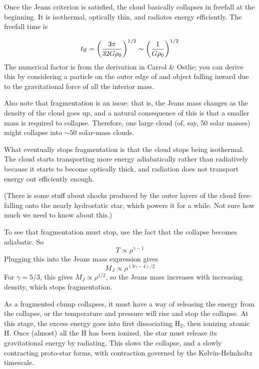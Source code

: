 Once the Jeans criterion is satisfied, the cloud basically collapses in freefall at the beginning. It is isothermal, optically thin, and radiates energy efficiently. The freefall time is

\begin{equation}
t_{\rm ff} = \biggl( \frac{3 \pi}{32 G \rho_0}\biggr)^{1/2} \sim \biggl( \frac{1}{G \rho_0}\biggr)^{1/2}
\end{equation}
The numerical factor is from the derivation in Carrol \& Ostlie; you can derive this by considering a particle on the outer edge of and object falling inward due to the gravitational force of all the interior mass.

Also note that fragmentation is an issue: that is, the Jeans mass changes as the density of the cloud goes up, and a natural consequence of this is that a smaller mass is required to collapse. Therefore, one large cloud (of, say, 50 solar masses) might collapse into $\sim 50$ solar-mass clouds.

What eventually stops fragmentation is that the cloud stops being isothermal. The cloud starts transporting more energy adiabatically rather than radiatively because it starts to become optically thick, and radiation does not transport energy out efficiently enough.

(There is some stuff about shocks produced by the outer layers of the cloud free-falling onto the nearly hydrostatic star, which powers it for a while. Not sure how much we need to know about this.)

To see that fragmentation must stop, use the fact that the collapse becomes 
adiabatic.  So
\begin{equation}
T\propto\rho^{\gamma-1}
\end{equation}
Plugging this into the Jeans mass expression gives
\begin{equation}
M_J\propto\rho^{(3\gamma-4)/2}
\end{equation}
For $\gamma=5/3$, this gives $M_J\propto\rho^{1/2}$, so the Jeans mass 
increases with increasing density, which stops fragmentation.

As a fragmented clump collapses, it must have a way of releasing the energy from the collapse, or 
the temperature and pressure will rise and stop the collapse.  At this stage, the excess energy 
goes into first dissociating H$_2$, then ionizing atomic H.  Once (almost) all the H has been 
ionized, the star must release its gravitational energy by radiating.  This slows the collapse, 
and a slowly contracting proto-star forms, with contraction governed by the Kelvin-Helmholtz 
timescale.  

